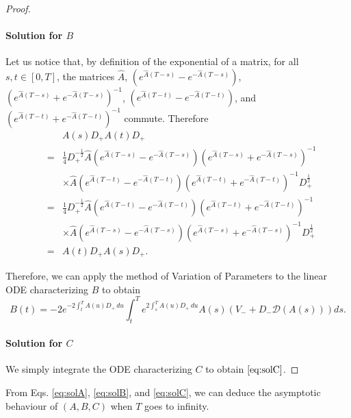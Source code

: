 \documentclass[preprint, 3p]{elsarticle}
\newcommand{\1}{{\chi}}
\begin{document}
\begin{proof}
\paragraph{\textbf{Solution for $B$}}
Let us notice that, by definition of the exponential of a matrix, for all $s,t \in [0,T]$, the matrices $\widehat{A}$, $\left(
e^{ \widehat{A} (T - s)} - e^{-\widehat{A} (T - s)} \right)$, $\left(
e^{ \widehat{A} (T - s)} + e^{-\widehat{A} (T - s)} \right)^{-1}$, $\left( e^{
\widehat{A} (T - t)} - e^{-\widehat{A} (T - t)} \right)$, and $\left( e^{
\widehat{A} (T - t)} + e^{-\widehat{A} (T - t)} \right)^{-1}$ commute. Therefore
\begin{eqnarray*}
&&A(s) D_+ A(t) D_+\\
&=& \frac{1}{4} D^{-\frac 12}_+ \widehat{A}
    \left( e^{ \widehat{A} (T - s)} - e^{-\widehat{A} (T - s)} \right)
    \left( e^{ \widehat{A} (T - s)} + e^{-\widehat{A} (T - s)} \right)^{-1}\\
&&\times\widehat{A}
    \left( e^{ \widehat{A} (T - t)} - e^{-\widehat{A} (T - t)} \right)
    \left( e^{ \widehat{A} (T - t)} + e^{-\widehat{A} (T - t)} \right)^{-1}D_+^{\frac 12}\\
    &=& \frac{1}{4} D^{-\frac 12}_+ \widehat{A}
    \left( e^{ \widehat{A} (T - t)} - e^{-\widehat{A} (T - t)} \right)
    \left( e^{ \widehat{A} (T - t)} + e^{-\widehat{A} (T - t)} \right)^{-1}\\
&&\times\widehat{A}
    \left( e^{\widehat{A} (T - s)} - e^{-\widehat{A} (T - s)} \right)
    \left( e^{ \widehat{A} (T - s)} + e^{-\widehat{A} (T - s)} \right)^{-1}D_+^{\frac 12}\\
&=& A(t) D_+ A(s) D_+.
\end{eqnarray*}

Therefore, we can apply the method of Variation of Parameters to the linear ODE characterizing $B$ to obtain
$$B(t) = -2 e^{-2 \int_t^T A(u) D_+ \,du} \int_t^T
            e^{ 2 \int_s^T A(u) D_+ \,du} A(s)
            \left( V_- + D_- \mathcal D(A(s)) \right) ds.$$

\paragraph{\textbf{Solution for $C$}}
We simply integrate the ODE characterizing $C$ to obtain $\eqref{eq:solC}$.

\end{proof}

From Eqs. \eqref{eq:solA}, \eqref{eq:solB}, and \eqref{eq:solC}, we can deduce the asymptotic behaviour of $(A,B,C)$ when $T$ goes to infinity.\\
\end{document}
